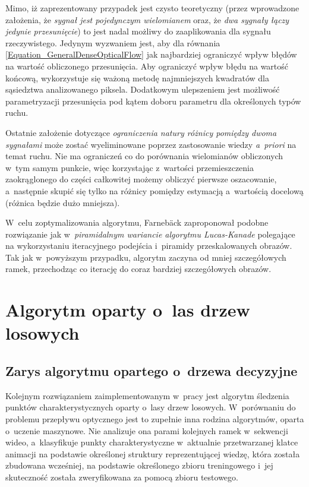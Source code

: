       Mimo, iż zaprezentowany przypadek jest czysto teoretyczny (przez wprowadzone założenia, że \textit{sygnał jest pojedynczym wielomianem} oraz, że \textit{dwa sygnały łączy jedynie przesunięcie}) to jest nadal możliwy do zaaplikowania dla sygnału rzeczywistego. Jedynym wyzwaniem jest, aby dla równania \ref{Equation_GeneralDenseOpticalFlow} jak najbardziej ograniczyć wpływ błędów na wartość obliczonego przesunięcia. Aby ograniczyć wpływ błędu na wartość końcową, wykorzystuje się ważoną metodę najmniejszych kwadratów dla sąsiedztwa analizowanego piksela. Dodatkowym ulepszeniem jest możliwość parametryzacji przesunięcia pod kątem doboru parametru dla określonych typów ruchu.

      Ostatnie założenie dotyczące \textit{ograniczenia natury różnicy pomiędzy dwoma sygnałami} może zostać wyeliminowane poprzez zastosowanie wiedzy \textit{a~priori} na temat ruchu. Nie ma ograniczeń co do porównania wielomianów obliczonych w~tym samym punkcie, więc korzystając z~wartości przemieszczenia zaokrąglonego do części całkowitej możemy obliczyć pierwsze oszacowanie, a~następnie skupić się tylko na różnicy pomiędzy estymacją a~wartością docelową (różnica będzie dużo mniejsza).

      W~celu zoptymalizowania algorytmu, Farnebäck zaproponował podobne rozwiązanie jak w~\textit{piramidalnym wariancie algorytmu Lucas-Kanade} polegające na wykorzystaniu iteracyjnego podejścia i~piramidy przeskalowanych obrazów. Tak jak w~powyższym przypadku, algorytm zaczyna od mniej szczegółowych ramek, przechodząc co iterację do coraz bardziej szczegółowych obrazów.

  \section{Algorytm oparty o~las drzew losowych}\label{Section_RandomizedTrees}

    \subsection{Zarys algorytmu opartego o~drzewa decyzyjne}

      Kolejnym rozwiązaniem zaimplementowanym w~pracy jest algorytm śledzenia punktów charakterystycznych oparty o~lasy drzew losowych. W~porównaniu do problemu przepływu optycznego jest to zupełnie inna rodzina algorytmów, oparta o~uczenie maszynowe. Nie analizuje ona parami kolejnych ramek w~sekwencji wideo, a~klasyfikuje punkty charakterystyczne w~aktualnie przetwarzanej klatce animacji na podstawie określonej struktury reprezentującej wiedzę, która została zbudowana wcześniej, na podstawie określonego zbioru treningowego i~jej skuteczność została zweryfikowana za pomocą zbioru testowego.

